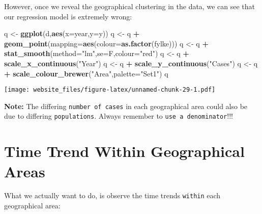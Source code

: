 \documentclass[]{book}
\newenvironment{Shaded}{\begin{snugshade}}{\end{snugshade}}
\newcommand{\KeywordTok}[1]{\textcolor[rgb]{0.13,0.29,0.53}{\textbf{#1}}}
\newcommand{\DataTypeTok}[1]{\textcolor[rgb]{0.13,0.29,0.53}{#1}}
\newcommand{\StringTok}[1]{\textcolor[rgb]{0.31,0.60,0.02}{#1}}
\newcommand{\OperatorTok}[1]{\textcolor[rgb]{0.81,0.36,0.00}{\textbf{#1}}}
\newcommand{\NormalTok}[1]{#1}
\begin{document}
However, once we reveal the geographical clustering in the data, we can
see that our regression model is extremely wrong:

\begin{Shaded}
\begin{Highlighting}[]
\NormalTok{q <-}\StringTok{ }\KeywordTok{ggplot}\NormalTok{(d,}\KeywordTok{aes}\NormalTok{(}\DataTypeTok{x=}\NormalTok{year,}\DataTypeTok{y=}\NormalTok{y))}
\NormalTok{q <-}\StringTok{ }\NormalTok{q }\OperatorTok{+}\StringTok{ }\KeywordTok{geom_point}\NormalTok{(}\DataTypeTok{mapping=}\KeywordTok{aes}\NormalTok{(}\DataTypeTok{colour=}\KeywordTok{as.factor}\NormalTok{(fylke)))}
\NormalTok{q <-}\StringTok{ }\NormalTok{q }\OperatorTok{+}\StringTok{ }\KeywordTok{stat_smooth}\NormalTok{(}\DataTypeTok{method=}\StringTok{"lm"}\NormalTok{,}\DataTypeTok{se=}\NormalTok{F,}\DataTypeTok{colour=}\StringTok{"red"}\NormalTok{)}
\NormalTok{q <-}\StringTok{ }\NormalTok{q }\OperatorTok{+}\StringTok{ }\KeywordTok{scale_x_continuous}\NormalTok{(}\StringTok{"Year"}\NormalTok{)}
\NormalTok{q <-}\StringTok{ }\NormalTok{q }\OperatorTok{+}\StringTok{ }\KeywordTok{scale_y_continuous}\NormalTok{(}\StringTok{"Cases"}\NormalTok{)}
\NormalTok{q <-}\StringTok{ }\NormalTok{q }\OperatorTok{+}\StringTok{ }\KeywordTok{scale_colour_brewer}\NormalTok{(}\StringTok{"Area"}\NormalTok{,}\DataTypeTok{palette=}\StringTok{"Set1"}\NormalTok{)}
\NormalTok{q}
\end{Highlighting}
\end{Shaded}

\texttt{[image: website\_files/figure-latex/unnamed-chunk-29-1.pdf]}

\textbf{Note:} The differing \texttt{number\ of\ cases} in each
geographical area could also be due to differing \texttt{populations}.
Always remember to \texttt{use\ a\ denominator}!!!

\section{Time Trend Within Geographical
Areas}\label{time-trend-within-geographical-areas}

What we actually want to do, is observe the time trends \texttt{within}
each geographical area:
\end{document}
